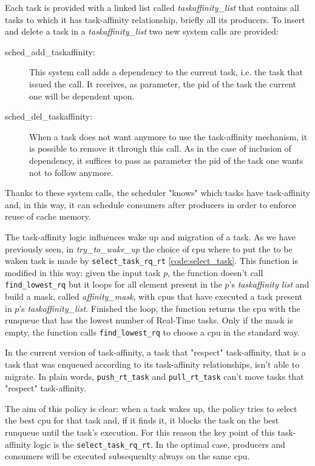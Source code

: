 Each task is provided with a linked list called \textit{taskaffinity\_list} that contains all tasks to which it has task-affinity relationship, briefly 
all its producers. To insert and delete a task in a \textit{taskaffinity\_list} two new system calls are provided:

\begin{description}

\item[sched\_add\_taskaffinity:] This system call adds a dependency to the current task, i.e. the task that issued the call. It receives, as parameter, the 
pid of the task the current one will be dependent upon.

\item[sched\_del\_taskaffinity:] When a task does not want anymore to use the task-affinity mechanism, it is possible to remove it through this call.
As in the case of inclusion of dependency, it suffices to pass as parameter the pid of the task one wants not to follow anymore.

\end{description}

Thanks to these system calls, the scheduler "knows" which tasks have task-affinity and, in this way, it can schedule consumers after producers in order to 
enforce reuse of cache memory.

The task-affinity logic influences wake up and migration of a task. As we have previously seen, in \textit{try\_to\_wake\_up} the choice of cpu where to 
put the to be waken task is made by \texttt{select\_task\_rq\_rt} \ref{code:select_task}. This function is modified in this way: given the input task $p$, 
the function doesn't call \texttt{find\_lowest\_rq} but it loops for all element present in the $p$'s \textit{taskaffinity list} and build a mask, called 
\textit{affinity\_mask}, with cpus that have executed a task present in $p$'s \textit{taskaffinity\_list}. Finished the loop, the function returns the cpu 
with the runqueue that has the lowest number of Real-Time tasks. Only if the mask is empty, the function calls \texttt{find\_lowest\_rq} to choose a cpu
in the standard way. 

In the current version of task-affinity, a task that "respect" task-affinity, that is a task that was enqueued according to its task-affinity 
relationships, isn't able to migrate. In plain words, \texttt{push\_rt\_task} and \texttt{pull\_rt\_task} can't move tasks that "respect" task-affinity.

The aim of this policy is clear: when a task wakes up, the policy tries to select the best cpu for that task and, if it finds it, it blocks the task on the 
best runqueue until the task's execution. For this reason the key point of this task-affinity logic is the \texttt{select\_task\_rq\_rt}. In the optimal 
case, producers and consumers will be executed subsequenlty always on the same cpu.

